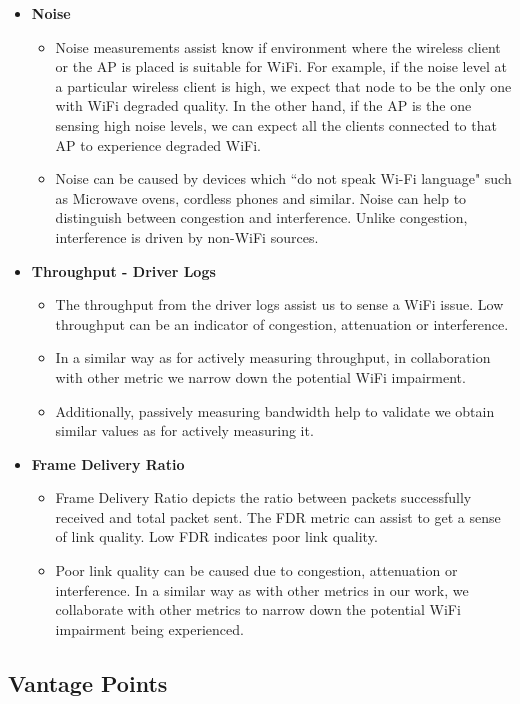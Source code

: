 \begin{itemize}
	\item \textbf{Noise}
	\begin{itemize}
		\item  Noise measurements assist know if environment where the wireless client or the AP is placed is suitable for WiFi. For example, if the noise level at a particular wireless client is high, we expect that node to be the only one with WiFi degraded quality. In the other hand, if the AP is the one sensing high noise levels, we can expect all the clients connected to that AP to experience degraded WiFi.
		\item Noise can be caused by devices which ``do not speak Wi-Fi language" such as Microwave ovens, cordless phones and similar. Noise can help to distinguish between congestion and interference. Unlike congestion, interference is driven by non-WiFi sources.
	\end{itemize}
	
	\item \textbf{Throughput - Driver Logs}
	\begin{itemize}
		\item The throughput from the driver logs assist us to sense a WiFi issue. Low throughput can be an indicator of congestion, attenuation or interference.
		\item In a similar way as for actively measuring throughput, in collaboration with other metric we narrow down the potential WiFi impairment.
		\item Additionally, passively measuring bandwidth help to validate we obtain similar values as for actively measuring it.
	\end{itemize}
	
	\item \textbf{Frame Delivery Ratio}
	\begin{itemize}
		\item Frame Delivery Ratio depicts the ratio between packets successfully received and total packet sent. The FDR metric can assist to get a sense of link quality. Low FDR indicates poor link quality. 
		\item Poor link quality can be caused due to congestion, attenuation or interference. In a similar way as with other metrics in our work, we collaborate with other metrics to narrow down the potential WiFi impairment being experienced.
	\end{itemize}

\end{itemize}

\subsection{Vantage Points}

